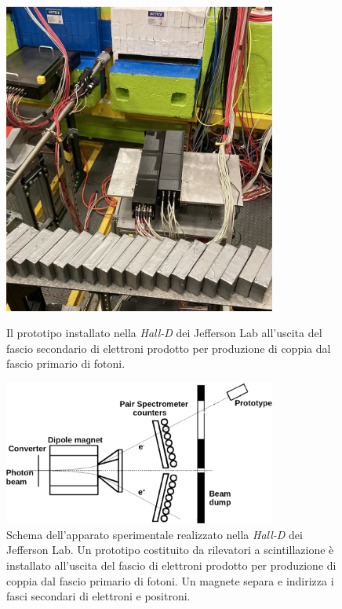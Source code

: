 \documentclass[../main.tex]{subfiles}
\begin{document}
\begin{figure}[ptb]
    \centering
    \includegraphics[width=0.8\textwidth]{3x3telescope.jpg}
    \caption{
	    Il prototipo installato nella \emph{Hall-D} dei Jefferson Lab all'uscita del fascio secondario di elettroni prodotto per produzione di coppia dal fascio primario di fotoni. 
	\cite{3x3telescope}}
    \label{fig:3x3}

    \centering
    \includegraphics[width=0.8\textwidth]{ps_bw_trasp.png}
    \caption{
Schema dell'apparato sperimentale realizzato nella \emph{Hall-D} dei Jefferson Lab. Un prototipo costituito da rilevatori a scintillazione è installato all'uscita del fascio di elettroni prodotto per produzione di coppia dal fascio primario di fotoni. Un magnete separa e indirizza i fasci secondari di elettroni e positroni.
	\cite{3x3telescope}}
    \label{fig:3x3_scheme}
\end{figure}
\end{document}
